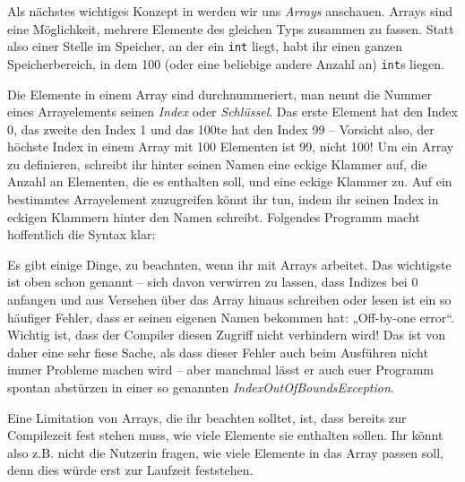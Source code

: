 
Als nächstes wichtiges Konzept in \Java werden wir uns \emph{Arrays} anschauen.
Arrays sind eine Möglichkeit, mehrere Elemente des gleichen Typs zusammen zu
fassen. Statt also einer Stelle im Speicher, an der ein \texttt{int} liegt, habt
ihr einen ganzen Speicherbereich, in dem 100 (oder eine beliebige andere Anzahl
an) \texttt{int}s liegen.

Die Elemente in einem Array sind durchnummeriert, man nennt die Nummer eines
Arrayelements seinen \emph{Index} oder \emph{Schlüssel}. Das erste Element hat
den Index 0, das zweite den Index 1 und das 100te hat den Index 99 -- Vorsicht
also, der höchste Index in einem Array mit 100 Elementen ist 99, nicht 100! Um
ein Array zu definieren, schreibt ihr hinter seinen Namen eine eckige Klammer
auf, die Anzahl an Elementen, die es enthalten soll, und eine eckige Klammer zu.
Auf ein bestimmtes Arrayelement zuzugreifen könnt ihr tun, indem ihr seinen
Index in eckigen Klammern hinter den Namen schreibt. Folgendes Programm macht
hoffentlich die Syntax klar:


Es gibt einige Dinge, zu beachnten, wenn ihr mit Arrays arbeitet. Das wichtigste
ist oben schon genannt -- sich davon verwirren zu lassen, dass Indizes bei 0
anfangen und aus Versehen über das Array hinaus schreiben oder lesen ist ein so
häufiger Fehler, dass er seinen eigenen Namen bekommen hat: „Off-by-one error“.
Wichtig ist, dass der Compiler diesen Zugriff nicht verhindern wird! Das ist von
daher eine sehr fiese Sache, als dass dieser Fehler auch beim Ausführen nicht
immer Probleme machen wird -- aber manchmal lässt er auch euer Programm spontan
abstürzen in einer so genannten \emph{IndexOutOfBoundsException}.

Eine Limitation von Arrays, die ihr beachten solltet, ist, dass bereits zur
Compilezeit fest stehen muss, wie viele Elemente sie enthalten sollen. Ihr könnt
also z.B. nicht die Nutzerin fragen, wie viele Elemente in das Array passen
soll, denn dies würde erst zur Laufzeit feststehen.


